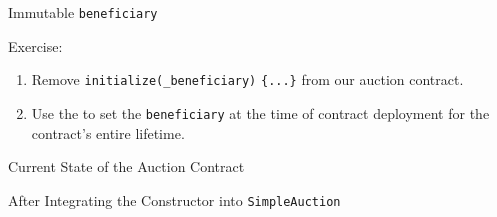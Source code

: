 \documentclass[]{beamer}
\begin{document}
\begin{frame}{Immutable \texttt{beneficiary}}

	\begin{exercise}{Exercise:}
		\begin{enumerate}
			\item Remove  \texttt{initialize(}\texttt{\_beneficiary)}  \texttt{\{...\}} from our auction contract.
			\item Use the  to set the \texttt{beneficiary} at the time of contract deployment for the contract's entire lifetime.
		\end{enumerate}
	\end{exercise}
		
	
\end{frame}

\begin{frame}{Current State of the Auction Contract}
	\begin{samplecode}{After Integrating the Constructor into \texttt{SimpleAuction}}
		
	\end{samplecode}
\end{frame}
\end{document}
